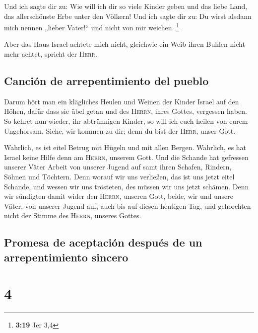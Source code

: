  Und ich sagte dir zu: Wie will ich dir so viele Kinder
geben und das liebe Land, das allerschönste Erbe unter den Völkern! Und
ich sagte dir zu: Du wirst alsdann mich nennen „lieber Vater!{}`` und
nicht von mir weichen. \footnote{\textbf{3:19} Jer 3,4}

 Aber das Haus Israel achtete mich nicht, gleichwie ein
Weib ihren Buhlen nicht mehr achtet, spricht der \textsc{Herr}.

\hypertarget{canciuxf3n-de-arrepentimiento-del-pueblo}{%
\subsection{Canción de arrepentimiento del
pueblo}\label{canciuxf3n-de-arrepentimiento-del-pueblo}}

 Darum hört man ein klägliches Heulen und Weinen der
Kinder Israel auf den Höhen, dafür dass sie übel getan und des
\textsc{Herrn}, ihres Gottes, vergessen haben.  So kehret
nun wieder, ihr abtrünnigen Kinder, so will ich euch heilen von eurem
Ungehorsam. Siehe, wir kommen zu dir; denn du bist der \textsc{Herr},
unser Gott.

 Wahrlich, es ist eitel Betrug mit Hügeln und mit allen
Bergen. Wahrlich, es hat Israel keine Hilfe denn am \textsc{Herrn},
unserem Gott.  Und die Schande hat gefressen unserer
Väter Arbeit von unserer Jugend auf samt ihren Schafen, Rindern, Söhnen
und Töchtern.  Denn worauf wir uns verließen, das ist uns
jetzt eitel Schande, und wessen wir uns trösteten, des müssen wir uns
jetzt schämen. Denn wir sündigten damit wider den \textsc{Herrn},
unseren Gott, beide, wir und unsere Väter, von unserer Jugend auf, auch
bis auf diesen heutigen Tag, und gehorchten nicht der Stimme des
\textsc{Herrn}, unseres Gottes.

\hypertarget{promesa-de-aceptaciuxf3n-despuuxe9s-de-un-arrepentimiento-sincero}{%
\subsection{Promesa de aceptación después de un arrepentimiento
sincero}\label{promesa-de-aceptaciuxf3n-despuuxe9s-de-un-arrepentimiento-sincero}}

\hypertarget{section-3}{%
\section{4}\label{section-3}}

